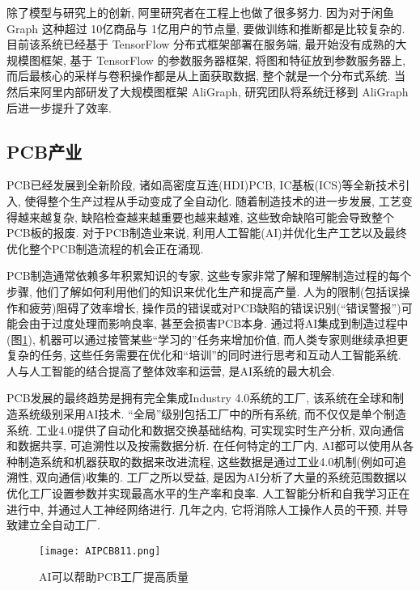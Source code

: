 除了模型与研究上的创新, 阿里研究者在工程上也做了很多努力. 因为对于闲鱼 Graph 这种超过 10亿商品与 1亿用户的节点量, 要做训练和推断都是比较复杂的.
目前该系统已经基于 TensorFlow 分布式框架部署在服务端, 最开始没有成熟的大规模图框架, 基于 TensorFlow 的参数服务器框架,  将图和特征放到参数服务器上, 而后最核心的采样与卷积操作都是从上面获取数据, 整个就是一个分布式系统.
当然后来阿里内部研发了大规模图框架 AliGraph, 研究团队将系统迁移到 AliGraph 后进一步提升了效率.
\subsection{PCB产业}
PCB已经发展到全新阶段, 诸如高密度互连(HDI)PCB, IC基板(ICS)等全新技术引入, 使得整个生产过程从手动变成了全自动化.
随着制造技术的进一步发展, 工艺变得越来越复杂, 缺陷检查越来越重要也越来越难, 这些致命缺陷可能会导致整个PCB板的报废. 对于PCB制造业来说, 利用人工智能(AI)并优化生产工艺以及最终优化整个PCB制造流程的机会正在涌现.

PCB制造通常依赖多年积累知识的专家, 这些专家非常了解和理解制造过程的每个步骤, 他们了解如何利用他们的知识来优化生产和提高产量.
人为的限制(包括误操作和疲劳)阻碍了效率增长, 操作员的错误或对PCB缺陷的错误识别(“错误警报”)可能会由于过度处理而影响良率, 甚至会损害PCB本身.
通过将AI集成到制造过程中(图\ref{AIPCB811Fig4}), 机器可以通过接管某些“学习的”任务来增加价值, 而人类专家则继续承担更复杂的任务, 这些任务需要在优化和“培训”的同时进行思考和互动人工智能系统.
人与人工智能的结合提高了整体效率和运营, 是AI系统的最大机会.

PCB发展的最终趋势是拥有完全集成Industry 4.0系统的工厂, 该系统在全球和制造系统级别采用AI技术. “全局”级别包括工厂中的所有系统, 而不仅仅是单个制造系统.
工业4.0提供了自动化和数据交换基础结构, 可实现实时生产分析, 双向通信和数据共享, 可追溯性以及按需数据分析.
在任何特定的工厂内, AI都可以使用从各种制造系统和机器获取的数据来改进流程, 这些数据是通过工业4.0机制(例如可追溯性, 双向通信)收集的.
工厂之所以受益, 是因为AI分析了大量的系统范围数据以优化工厂设置参数并实现最高水平的生产率和良率.
人工智能分析和自我学习正在进行中, 并通过人工神经网络进行. 几年之内, 它将消除人工操作人员的干预, 并导致建立全自动工厂.
\begin{figure}[H]
	\centering
	\texttt{[image: AIPCB811.png]}
	\caption{AI可以帮助PCB工厂提高质量}
   \label{AIPCB811Fig4}
\end{figure}


